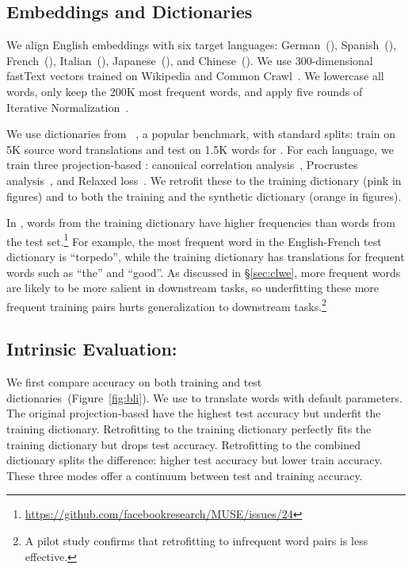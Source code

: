 \subsection{Embeddings and Dictionaries}

We align English embeddings with six target languages: German~(),
Spanish~(), French~(), Italian~(), Japanese~(),
and Chinese~().
We use 300-dimensional fastText vectors trained on Wikipedia and Common
Crawl~\citep{grave-18}. 
We lowercase all words, only keep the 200K most frequent words, and apply five
rounds of Iterative Normalization~\citep{zhang-19}.

We use dictionaries from ~\citep{conneau-18}, a popular 
benchmark, with standard splits: train on 5K source word translations and test
on 1.5K words for .
For each language, we train three projection-based :
canonical correlation analysis~\citep[]{faruqui-14}, Procrustes
analysis~\citep[]{conneau-18}, and Relaxed 
loss~\citep[]{joulin-18}.
We retrofit these  to the training dictionary (pink in figures) and
to both the training and the synthetic dictionary (orange in figures).

In , words from the training dictionary have higher
frequencies than words from the test
set.\footnote{\url{https://github.com/facebookresearch/MUSE/issues/24}}
For example, the most frequent word in the English-French test
dictionary is ``torpedo'', while the training dictionary has
translations for frequent words such as ``the'' and ``good''.  As
discussed in \S\ref{sec:clwe}, more frequent words are likely to
be more salient in downstream tasks, so underfitting these more
frequent training pairs hurts generalization to downstream
tasks.\footnote{A pilot study confirms that retrofitting to infrequent
  word pairs is less effective.}

\subsection{Intrinsic Evaluation: }

We first compare  accuracy on both training and test
dictionaries~(Figure~\ref{fig:bli}).
We use  to translate words with default parameters.
The original projection-based  have the highest test accuracy but
underfit the training dictionary.
Retrofitting to the training dictionary perfectly fits the training
dictionary but drops test accuracy.
Retrofitting to the combined dictionary splits the difference: higher test
accuracy but lower train accuracy.
These three modes offer a continuum between  test and
training accuracy.

